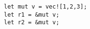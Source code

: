 \begin{lstlisting}[style=Rust]
let mut v = vec![1,2,3];
let r1 = &mut v;
let r2 = &mut v;
\end{lstlisting}
